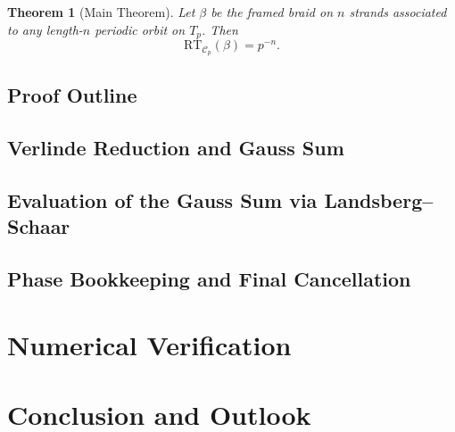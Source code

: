 \documentclass[11pt,a4paper]{amsart}
\newtheorem{theorem}{Theorem}[section]
\begin{document}
\begin{theorem}[Main Theorem]
\label{thm:main}
Let \(\beta\) be the framed braid on \(n\) strands associated to any length-\(n\) periodic orbit on \(T_p\). Then
\[
\mathrm{RT}_{\mathcal{C}_p}(\beta)=p^{-n}.
\]
\end{theorem}

\subsection{Proof Outline}


\subsection{Verlinde Reduction and Gauss Sum}


\subsection{Evaluation of the Gauss Sum via Landsberg--Schaar}


\subsection{Phase Bookkeeping and Final Cancellation}


\section{Numerical Verification}
\label{sec:verification}


\section{Conclusion and Outlook}
\label{sec:conclusion}


\appendix
\end{document}
